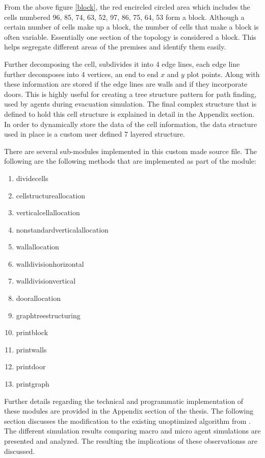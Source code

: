 From the above figure \ref{block}, the red encircled circled area which includes the cells numbered 96, 85, 74, 63, 52, 97, 86, 75, 64, 53 form a block. Although a certain number of cells make up a block, the number of cells that make a block is often variable. Essentially one section of the topology is considered a block. This helps segregate different areas of the premises and identify them easily.

Further decomposing the cell, subdivides it into 4 edge lines, each edge line further decomposes into 4 vertices, an end to end $x$ and $y$ plot points. Along with these information are stored if the edge lines are walls and if they incorporate doors. This is highly useful for creating a tree structure pattern for path finding, used by agents during evacuation simulation. The final complex structure that is defined to hold this cell structure is explained in detail in the Appendix section. In order to dynamically store the data of the cell information, the data structure used in place is a custom user defined 7 layered structure. 

There are several sub-modules implemented in this custom made source file. The following are the following methods that are implemented as part of the module:

\begin{enumerate}
  \item divide\textunderscore cells
  \item cell\textunderscore structure\textunderscore allocation
  \item vertical\textunderscore cell\textunderscore allocation
  \item non\textunderscore standard\textunderscore vertical\textunderscore allocation
  \item wall\textunderscore allocation
  \item wall\textunderscore division\textunderscore horizontal
  \item wall\textunderscore division\textunderscore vertical
  \item door\textunderscore allocation
  \item graph\textunderscore tree\textunderscore structuring
  \item print\textunderscore block
  \item print\textunderscore walls
  \item print\textunderscore door
  \item print\textunderscore graph
\end{enumerate}

Further details regarding the technical and programmatic implementation of these modules are provided in the Appendix section of the thesis. The following section discusses the modification to the existing unoptimized algorithm from \cite{ref5}. The different simulation results comparing macro and micro agent simulations are presented and analyzed. The resulting the implications of these observationss are discussed. 

